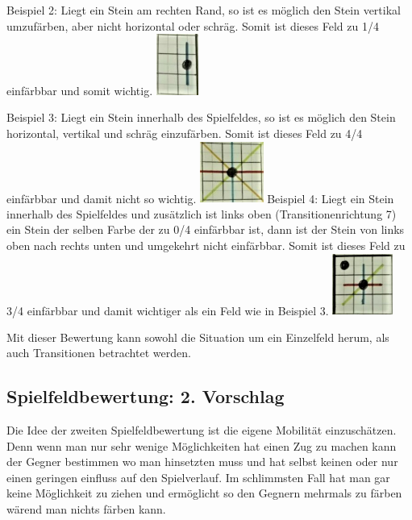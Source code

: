 \documentclass[12pt,a4paper,bibliography=totocnumbered,listof=totocnumbered]{scrartcl}
\begin{document}
Beispiel 2: Liegt ein Stein am rechten Rand, so ist es möglich den Stein vertikal umzufärben, aber nicht horizontal oder schräg. Somit ist dieses Feld zu 1/4 einfärbbar und somit wichtig.\newline
\includegraphics[height=2cm]{pics/beispiel2}

Beispiel 3: Liegt ein Stein innerhalb des Spielfeldes, so ist es möglich den Stein horizontal, vertikal und schräg einzufärben. Somit ist dieses Feld zu 4/4 einfärbbar und damit nicht so wichtig.\newline
\includegraphics[height=2cm]{pics/beispiel3}
\newpage
Beispiel 4: Liegt ein Stein innerhalb des Spielfeldes und zusätzlich ist links oben (Transitionenrichtung 7) ein Stein der selben Farbe der zu 0/4 einfärbbar ist, dann ist der Stein von links oben nach rechts unten und umgekehrt nicht einfärbbar. Somit ist dieses Feld zu 3/4 einfärbbar und damit wichtiger als ein Feld wie in Beispiel 3.\newline
\includegraphics[height=2cm]{pics/beispiel4}

Mit dieser Bewertung kann sowohl die Situation um ein Einzelfeld herum, als auch Transitionen betrachtet werden. 

\subsection{Spielfeldbewertung: 2. Vorschlag}
Die Idee der zweiten Spielfeldbewertung ist die eigene Mobilität einzuschätzen. Denn wenn man nur sehr wenige Möglichkeiten hat einen Zug zu machen kann der Gegner bestimmen wo man hinsetzten muss und hat selbst keinen oder nur einen geringen einfluss auf den Spielverlauf. Im schlimmsten Fall hat man gar keine Möglichkeit zu ziehen und ermöglicht so den Gegnern mehrmals zu färben wärend man nichts färben kann.
\end{document}
